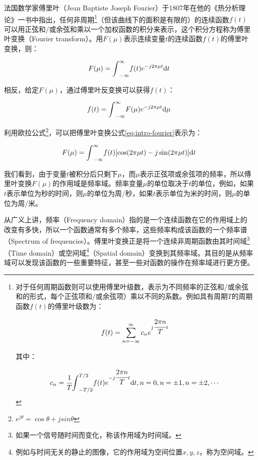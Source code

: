 法国数学家傅里叶（Jean Baptiste Joseph Fourier）于1807年在他的《热分析理论》一书中指出，任何非周期\footnote{对于任何周期函数则可以使用傅里叶级数，表示为不同频率的正弦和/或余弦和的形式，每个正弦项和/或余弦项）乘以不同的系数。例如具有周期$T$的周期函数$f(t)$的傅里叶级数为：

\begin{equation}\label{eq:fourier-series}
	f(t)=\sum^{\infty}_{n=-\infty}c_n e^{j \cfrac{2\pi n}{T}t}
\end{equation}

\noindent 其中：

\begin{equation}
	c_n= \cfrac{1}{T}{\rm \int}^{T/2}_{-T/2}f(t)e^{-j \cfrac{2\pi n}{T}t}{\rm d}t, n=0,n=\pm 1,n=\pm 2,\cdots
\end{equation}

}（但该曲线下的面积是有限的）的连续函数$f(t)$可以用正弦和/或余弦和乘以一个加权函数的积分来表示，这个积分方程称为傅里叶变换（Fourier transform）。用$F(\mu)$表示连续变量$t$的连续函数$f(t)$的傅里叶变换，则：

\begin{equation}\label{eq:intro-fourier}
	F(\mu)={\rm \int}^{\infty}_{-\infty}f(t)e^{-j2\pi\mu t}{\rm d}t
\end{equation}

\noindent 相反，给定$F(\mu)$，通过傅里叶反变换可以获得$f(t)$：

\begin{equation}
	f(t)={\rm \int}^{\infty}_{-\infty}F(\mu)e^{-j2\pi\mu t}{\rm d}\mu
\end{equation}

\noindent 利用欧拉公式\footnote{$e^{j\theta}=\cos\theta +jsin\theta$}，可以把傅里叶变换公式\ref{eq:intro-fourier}表示为：

\begin{equation}
	F(\mu)={\rm \int}^{\infty}_{-\infty}f(t)[\cos (2\pi\mu t)-j\sin(2\pi\mu t)]{\rm d}t
\end{equation}

\noindent 我们看到，由于变量$t$被积分后只剩下$\mu$，而$\mu$表示正弦项或余弦项的频率，所以傅里叶变换$F(\mu)$的作用域是频率域。频率变量$\mu$的单位取决于$t$的单位，例如，如果$t$表示单位为秒的时间，则$\mu$的单位为周/秒，如果$t$表示单位为米的时间，则$\mu$的单位为周/米。

从广义上讲，频率（Frequency domain）指的是一个连续函数在它的作用域上的改变有多快，所以一个函数通常有多个频率，这些频率构成该函数的一个频率谱（Spectrum of frequencies）。傅里叶变换正是将一个连续非周期函数由其时间域\footnote{如果一个信号随时间而变化，称该作用域为时间域。}（Time domain）或空间域\footnote{例如与时间无关的静止的图像，它的作用域为空间位置$x,y,z$，称为空间域。}（Spatial domain）变换到其频率域。其目的是从频率域可以发现该函数的一些重要特征，甚至一些对函数的操作在频率域进行更方便。

